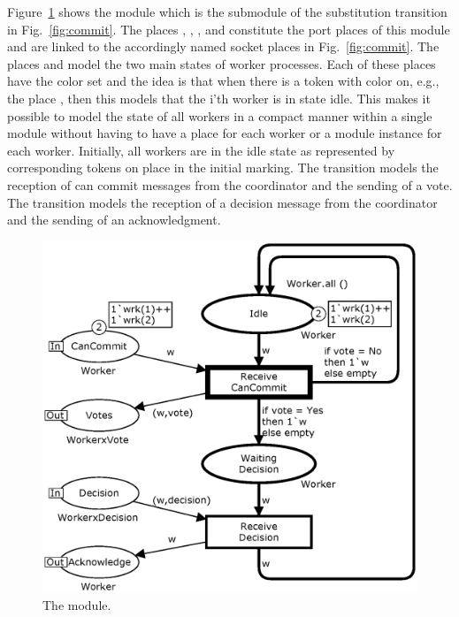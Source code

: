 Figure~\ref{fig:worker} shows the  module which is the
submodule of the  substitution transition in
Fig.~\ref{fig:commit}. The places ,
, , and 
constitute the port places of this module and are linked to the
accordingly named socket places in Fig.~\ref{fig:commit}. The places
 and  model the two main
states of worker processes. Each of these places have the color set
 and the idea is that when there is a token with color
 on, e.g., the place , then this models
that the i'th worker is in state idle. This makes it possible to model
the state of all workers in a compact manner within a single module
without having to have a place for each worker or a module instance
for each worker. Initially, all workers are in the idle state as
represented by corresponding tokens on place  in the
initial marking. The transition  models the
reception of can commit messages from the coordinator and the sending
of a vote. The transition  models the
reception of a decision message from the coordinator and the sending
of an acknowledgment.

\begin{figure}[]
\centering
\includegraphics[scale=.45]{figures/Workers.eps}
\caption{The  module.}
\label{fig:worker}
\end{figure}

